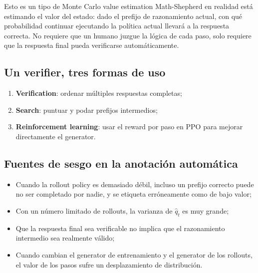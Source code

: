 
\begin{knowledgebox}{Esto es un tipo de Monte Carlo value estimation}
Math-Shepherd en realidad está estimando el valor del estado: dado el prefijo de razonamiento actual, con qué probabilidad continuar ejecutando la política actual llevará a la respuesta correcta. No requiere que un humano juzgue la lógica de cada paso, solo requiere que la respuesta final pueda verificarse automáticamente.
\end{knowledgebox}

\subsection{Un verifier, tres formas de uso}


\begin{enumerate}
    \item \textbf{Verification}: ordenar múltiples respuestas completas;
    \item \textbf{Search}: puntuar y podar prefijos intermedios;
    \item \textbf{Reinforcement learning}: usar el reward por paso en PPO para mejorar directamente el generator.
\end{enumerate}



\subsection{Fuentes de sesgo en la anotación automática}

\begin{itemize}
    \item Cuando la rollout policy es demasiado débil, incluso un prefijo correcto puede no ser completado por nadie, y se etiqueta erróneamente como de bajo valor;
    \item Con un número limitado de rollouts, la varianza de $\hat q_t$ es muy grande;
    \item Que la respuesta final sea verificable no implica que el razonamiento intermedio sea realmente válido;
    \item Cuando cambian el generator de entrenamiento y el generator de los rollouts, el valor de los pasos sufre un desplazamiento de distribución.
\end{itemize}

